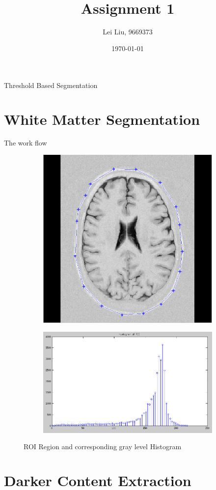 \documentclass [11pt]{article}
\begin{document}
\title{Assignment 1}
\author{Lei Liu, 9669373}
\date{\today}
\maketitle

\noindent Threshold Based Segmentation
\section{White Matter Segmentation}

The work flow 

\begin{figure}[h]	
\centering
\begin{subfigure}{.5\textwidth}
  \centering
  \includegraphics[width=.8\linewidth]{Brain_ROI}
  \label{fig:sfig1}
\end{subfigure}
\begin{subfigure}{.5\textwidth}
  \centering
  \includegraphics[width=.8\linewidth]{Brain_Hist}
  \label{fig:sfig1}
\end{subfigure}
\caption{ROI Region and corresponding gray level Histogram }
\end{figure}

\section{Darker Content Extraction}
\end{document}
